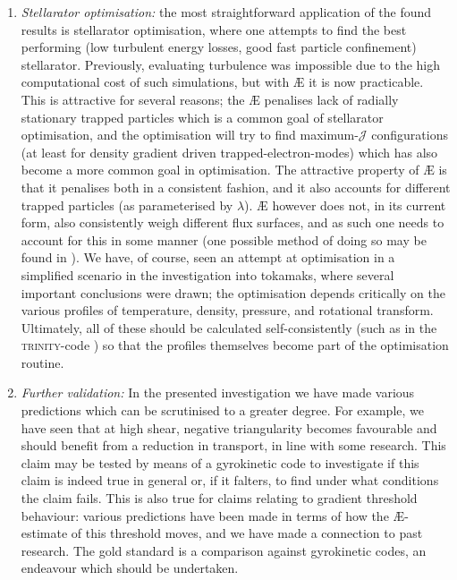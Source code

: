 \begin{enumerate}
    \item {\it Stellarator optimisation:} the most straightforward application of the found results is stellarator optimisation, where one attempts to find the best performing (low turbulent energy losses, good fast particle confinement) stellarator. Previously, evaluating turbulence was impossible due to the high computational cost of such simulations, but with \AE{} it is now practicable. This is attractive for several reasons; the \AE{} penalises lack of radially stationary trapped particles which is a common goal of stellarator optimisation, and the optimisation will try to find maximum-$\mathcal{J}$ configurations (at least for density gradient driven trapped-electron-modes) which has also become a more common goal in optimisation. The attractive property of \AE{} is that it penalises both in a consistent fashion, and it also accounts for different trapped particles (as parameterised by $\lambda$). \AE{} however does not, in its current form, also consistently weigh different flux surfaces, and as such one needs to account for this in some manner (one possible method of doing so may be found in \citet{goodman2022constructing}). We have, of course, seen an attempt at optimisation in a simplified scenario in the investigation into tokamaks, where several important conclusions were drawn; the optimisation depends critically on the various profiles of temperature, density, pressure, and rotational transform. Ultimately, all of these should be calculated self-consistently (such as in the \textsc{trinity}-code \cite{barnes2009trinity,barnes2010direct,highcock2014trinity,highcock2018optimisation}) so that the profiles themselves become part of the optimisation routine.
    \item {\it Further validation:} In the presented investigation we have made various predictions which can be scrutinised to a greater degree. For example, we have seen that at high shear, negative triangularity becomes favourable and should benefit from a reduction in transport, in line with some research. This claim may be tested by means of a gyrokinetic code to investigate if this claim is indeed true in general or, if it falters, to find under what conditions the claim fails. This is also true for claims relating to gradient threshold behaviour: various predictions have been made in terms of how the \AE{}-estimate of this threshold moves, and we have made a connection to past research. The gold standard is a comparison against gyrokinetic codes, an endeavour which should be undertaken.

\end{enumerate}
